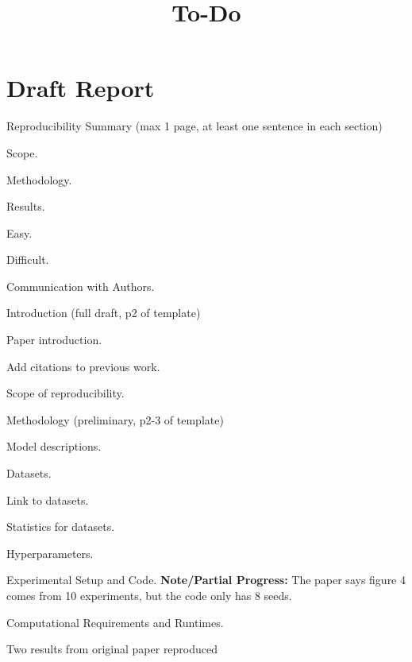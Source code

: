 \documentclass[12pt]{amsart}
\title{To-Do}
\begin{document}
\section{Draft Report}

\begin{enumerate}
    \item Reproducibility Summary (max 1 page, at least one sentence in each section)
    \begin{todolist}
        \item Scope.
        \item Methodology.
        \item Results.
        \item Easy.
        \item Difficult.
        \item Communication with Authors.
    \end{todolist}
    \item Introduction (full draft, p2 of template)
    \begin{todolist}
        \item Paper introduction.
        \begin{todolist}
            \item Add citations to previous work.
        \end{todolist}
        \item Scope of reproducibility.
    \end{todolist}
    \item Methodology (preliminary, p2-3 of template)
    \begin{todolist}
        \item Model descriptions.
        \item Datasets.
        \begin{todolist}
            \item Link to datasets.
            \item Statistics for datasets.
        \end{todolist}
        \item Hyperparameters.
        \item Experimental Setup and Code.
        \textbf{Note/Partial Progress:} The paper says figure 4 comes from 10 experiments, but the code only has 8 seeds.
        \item Computational Requirements and Runtimes.
    \end{todolist}
    \item Two results from original paper reproduced

\end{enumerate}
\end{document}

